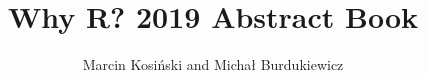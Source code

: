 \usepackage[utf8]{inputenc}

\title{Why R? 2019 Abstract Book}
\date{}
\author{Marcin Kosiński and Michał Burdukiewicz}

% 

